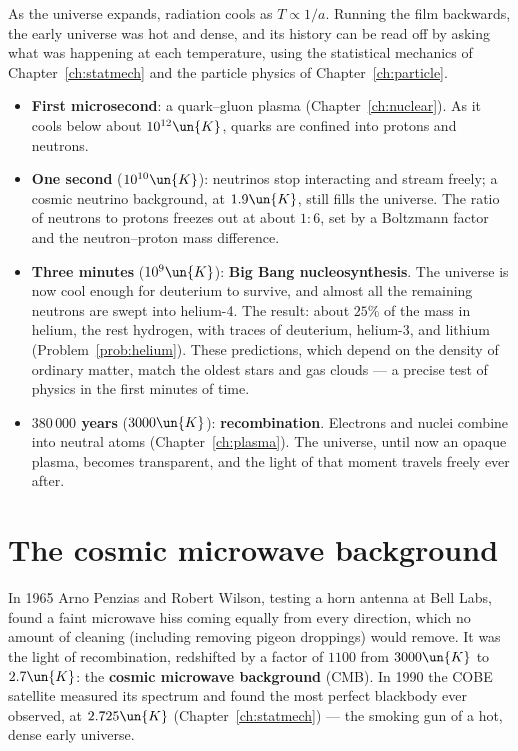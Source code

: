 As the universe expands, radiation cools as $T\propto1/a$. Running the film backwards, the early universe was hot and dense, and its history can be read off by asking what was happening at each temperature, using the statistical mechanics of Chapter~\ref{ch:statmech} and the particle physics of Chapter~\ref{ch:particle}.
\begin{itemize}[itemsep=4pt]
  \item \textbf{First microsecond}: a quark--gluon plasma (Chapter~\ref{ch:nuclear}). As it cools below about $10^{12}\un{K}$, quarks are confined into protons and neutrons.
  \item \textbf{One second} ($10^{10}\un{K}$): neutrinos stop interacting and stream freely; a cosmic neutrino background, at $1.9\un{K}$, still fills the universe. The ratio of neutrons to protons freezes out at about $1:6$, set by a Boltzmann factor and the neutron--proton mass difference.
  \item \textbf{Three minutes} ($10^9\un{K}$): \textbf{Big Bang nucleosynthesis}. The universe is now cool enough for deuterium to survive, and almost all the remaining neutrons are swept into helium-4. The result: about $25\%$ of the mass in helium, the rest hydrogen, with traces of deuterium, helium-3, and lithium (Problem~\ref{prob:helium}). These predictions, which depend on the density of ordinary matter, match the oldest stars and gas clouds --- a precise test of physics in the first minutes of time.
  \item \textbf{$380\,000$ years} ($3000\un{K}$): \textbf{recombination}. Electrons and nuclei combine into neutral atoms (Chapter~\ref{ch:plasma}). The universe, until now an opaque plasma, becomes transparent, and the light of that moment travels freely ever after.
\end{itemize}

\section{The cosmic microwave background}

In 1965 Arno Penzias and Robert Wilson, testing a horn antenna at Bell Labs, found a faint microwave hiss coming equally from every direction, which no amount of cleaning (including removing pigeon droppings) would remove. It was the light of recombination, redshifted by a factor of $1100$ from $3000\un{K}$ to $2.7\un{K}$: the \textbf{cosmic microwave background} (CMB). In 1990 the COBE satellite measured its spectrum and found the most perfect blackbody ever observed, at $2.725\un{K}$ (Chapter~\ref{ch:statmech}) --- the smoking gun of a hot, dense early universe.

